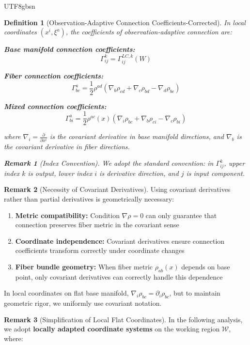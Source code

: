 \documentclass[a4paper,12pt]{extarticle}
\newtheorem{definition}{Definition}
\theoremstyle{definition}
\newtheorem{remark}{Remark}
\begin{document}
\begin{CJK}{UTF8}{gbsn}
\begin{definition}[Observation-Adaptive Connection Coefficients-Corrected]
In local coordinates $(x^i, \xi^a)$, the coefficients of observation-adaptive connection are:

\textbf{Base manifold connection coefficients:}
$$\Gamma^k_{ij} = \Gamma^{LC,k}_{ij}(W)$$

\textbf{Fiber connection coefficients:}
$$\Gamma^a_{bc} = \frac{1}{2}\rho^{ad}(\nabla_b \rho_{cd} + \nabla_c \rho_{bd} - \nabla_d \rho_{bc})$$

\textbf{Mixed connection coefficients:}
$$\Gamma^a_{bi} = \frac{1}{2}\rho^{ac}(x)(\nabla_i \rho_{bc} + \nabla_b \rho_{ci} - \nabla_c \rho_{bi})$$

where $\nabla_i = \frac{\partial}{\partial x^i}$ is the covariant derivative in base manifold directions, and $\nabla_b$ is the covariant derivative in fiber directions.

\begin{remark}[Index Convention]
We adopt the standard convention: in $\Gamma^k_{ij}$, upper index $k$ is output, lower index $i$ is derivative direction, and $j$ is input component.
\end{remark}
\end{definition}


\begin{remark}[Necessity of Covariant Derivatives]
Using covariant derivatives rather than partial derivatives is geometrically necessary:
\begin{enumerate}
\item \textbf{Metric compatibility:} Condition $\nabla \rho = 0$ can only guarantee that connection preserves fiber metric in the covariant sense
\item \textbf{Coordinate independence:} Covariant derivatives ensure connection coefficients transform correctly under coordinate changes
\item \textbf{Fiber bundle geometry:} When fiber metric $\rho_{ab}(x)$ depends on base point, only covariant derivatives can correctly handle this dependence
\end{enumerate}

In local coordinates on flat base manifold, $\nabla_i \rho_{bc} = \partial_i \rho_{bc}$, but to maintain geometric rigor, we uniformly use covariant notation.
\end{remark}




\begin{remark}[Simplification of Local Flat Coordinates]
In the following analysis, we adopt \textbf{locally adapted coordinate systems} on the working region $\mathcal{W}$, where:


\end{remark}
\end{CJK}
\end{document}
